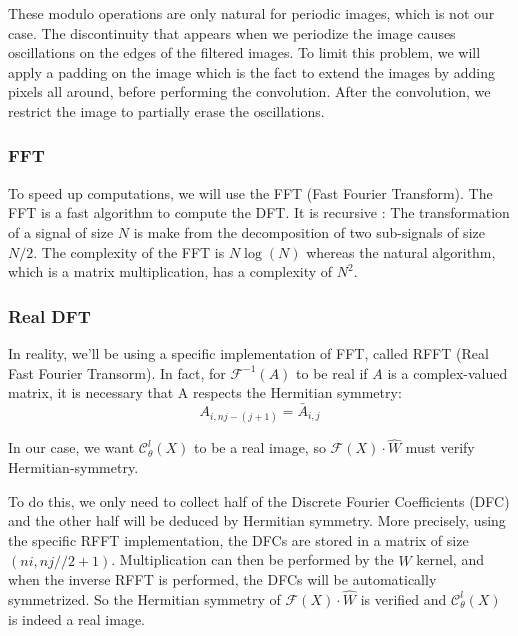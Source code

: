 \begin{Rem}
	These modulo operations are only natural for periodic images, which is not our case. The
	discontinuity that appears when we periodize the image causes oscillations on the edges of the filtered	images. To limit this problem, we will apply a padding on the image which is the fact to extend the images by adding pixels all around, before performing the convolution. After the convolution, we restrict the image to partially erase the oscillations.
\end{Rem}

\subsubsection{FFT}

To speed up computations, we will use the FFT (Fast Fourier Transform). The FFT is a fast algorithm to compute the DFT. It is recursive : The transformation of a signal of size $N$ is make from the decomposition of two sub-signals of size $N/2$. The complexity of the FFT is $N\log(N)$ whereas the natural algorithm, which is a matrix multiplication, has a complexity of $N^2$.

\subsubsection{Real DFT}

In reality, we'll be using a specific implementation of FFT, called RFFT (Real Fast Fourier Transorm). In fact, for $\mathcal{F}^{-1}(A)$ to be real if $A$ is a complex-valued matrix, it is necessary that A respects the Hermitian symmetry:
\begin{equation*}
	A_{i,nj-(j+1)} = \bar{A}_{i,j}
\end{equation*}

In our case, we want $\mathcal{C}_\theta^l(X)$ to be a real image, so $\mathcal{F}(X)\cdot\hat{W}$ must verify Hermitian-symmetry.

To do this, we only need to collect half of the Discrete Fourier Coefficients (DFC) and the other half will be deduced by Hermitian symmetry. More precisely, using the specific RFFT implementation, the DFCs are stored in a matrix of size $(ni,nj//2+1)$. Multiplication can then be performed by the $\hat{W}$ kernel, and when the inverse RFFT is performed, the DFCs will be automatically symmetrized. So the Hermitian symmetry of $\mathcal{F}(X)\cdot\hat{W}$ is verified and $\mathcal{C}_\theta^l(X)$ is indeed a real image.

